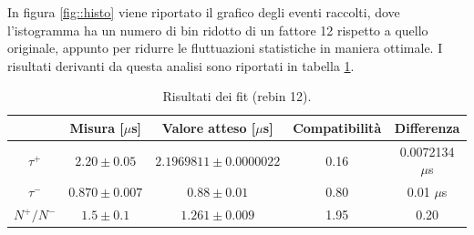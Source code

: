 \documentclass[11pt, oneside, a4paper]{article}   	%
\begin{document}
%
In figura \ref{fig::histo} viene riportato il grafico degli eventi raccolti, dove l'istogramma ha un numero di bin ridotto di un fattore 12 rispetto a quello originale, appunto per ridurre le fluttuazioni statistiche in maniera ottimale. I risultati derivanti da questa analisi sono riportati in tabella \ref{results}.
\begin{table}[H]
	\centering
	\begin{tabular}{ccccc}
		\toprule
		& Misura [$\mu$s]	&	Valore atteso [$\mu$s]	 & Compatibilità & Differenza 	\\	
		\midrule
		$\tau^+$	&	$2.20\pm 0.05$ & $2.1969811 \pm 0.0000022$ & 0.16 & 0.0072134 $\mu$s	\\
		$\tau^-$	&	$0.870\pm 0.007$ & $0.88 \pm 0.01$ & 0.80 & 0.01 $\mu$s	\\
		$N^+/N^-$	&	$1.5 \pm 0.1$ & $1.261 \pm 0.009$ & 1.95 & 0.20	\\
		\bottomrule
	\end{tabular}
	\caption{Risultati dei fit (rebin 12).}
	\label{results}
\end{table}


%
%
%
\appendix


%
%
%
%
\end{document}
